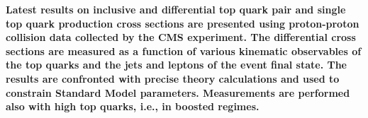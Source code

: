 {\bf
Latest results on inclusive and differential top quark pair and single top quark production cross 
sections are presented using proton-proton collision data collected by the CMS experiment. The 
differential cross sections are measured as a function of various kinematic observables of the top 
quarks and the jets and leptons of the event final state. The results are confronted with precise 
theory calculations and used to constrain Standard Model parameters. Measurements are performed also 
with high \pt top quarks, i.e., in boosted regimes.
}
